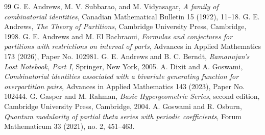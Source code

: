 \documentclass[10pt,a4paper]{amsart}
\numberwithin{equation}{section}
\begin{document}
\begin{thebibliography}{99}
 G. E. Andrews, M. V. Subbarao, and M. Vidyasagar, \emph{A family of combinatorial identities}, Canadian Mathematical Bulletin 15 (1972), 11--18. %
 G. E. Andrews, \emph{The Theory of Partitions}, Cambridge University Press, Cambridge, 1998. %
 G. E. Andrews and M. El Bachraoui, \emph{Formulas and conjectures for partitions with restrictions on interval of parts}, Advances in Applied Mathematics 173 (2026), Paper No. 102981. %
 G. E. Andrews and B. C. Berndt, \emph{Ramanujan's Lost Notebook, Part {I}}, Springer, New York, 2005. %
 A. Dixit and A. Goswami, \emph{Combinatorial identities associated with a bivariate generating function for overpartition pairs}, Advances in Applied Mathematics 143 (2023), Paper No. 102444. %
 G. Gasper and M. Rahman, \emph{Basic Hypergeometric Series}, second edition, Cambridge University Press, Cambridge, 2004. %
 A. Goswami and R. Osburn, \emph{Quantum modularity of partial theta series with periodic coefficients}, Forum Mathematicum 33 (2021), no. 2, 451--463.
\end{thebibliography}
\end{document}
